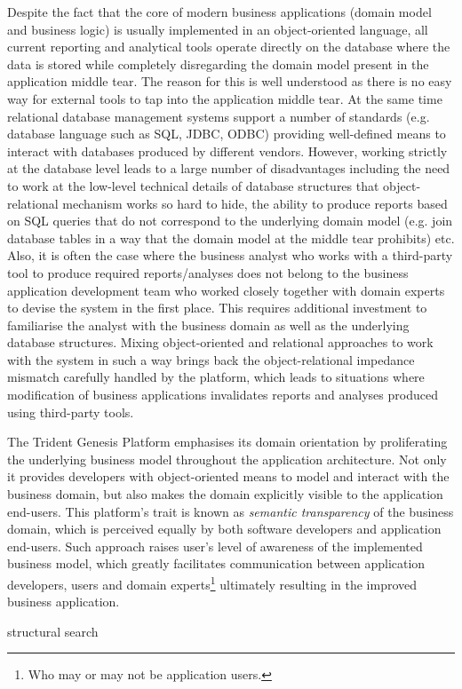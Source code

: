   Despite the fact that the core of modern business applications (domain model and business logic) is usually implemented in an object-oriented language, all current reporting and analytical tools operate directly on the database where the data is stored while completely disregarding the domain model present in the application middle tear.  
  The reason for this is well understood as there is no easy way for external tools to tap into the application middle tear.
  At the same time relational database management systems support a number of standards (e.g. database language such as SQL, JDBC, ODBC) providing well-defined means to interact with databases produced by different vendors.
  However, working strictly at the database level leads to a large number of disadvantages including the need to work at the low-level technical details of database structures that object-relational mechanism works so hard to hide, the ability to produce reports based on SQL queries that do not correspond to the underlying domain model (e.g. join database tables in a way that the domain model at the middle tear prohibits) etc.
  Also, it is often the case where the business analyst who works with a third-party tool to produce required reports/analyses does not belong to the business application development team who worked closely together with domain experts to devise the system in the first place.
  This requires additional investment to familiarise the analyst with the business domain as well as the underlying database structures.
  Mixing object-oriented and relational approaches to work with the system in such a way brings back the object-relational impedance mismatch carefully handled by the platform, which leads to situations where modification of business applications invalidates reports and analyses produced using third-party tools.

  The Trident Genesis Platform emphasises its domain orientation by proliferating the underlying business model throughout the application architecture.
  Not only it provides developers with object-oriented means to model and interact with the business domain, but also makes the domain explicitly visible to the application end-users.
  This platform's trait is known as \emph{semantic transparency} of the business domain, which is perceived equally by both software developers and application end-users.
  Such approach raises user's level of awareness of the implemented business model, which greatly facilitates communication between application developers, users and domain experts\footnote{Who may or may not be application users.} ultimately resulting in the improved business application.

  structural search

  
  
  

  